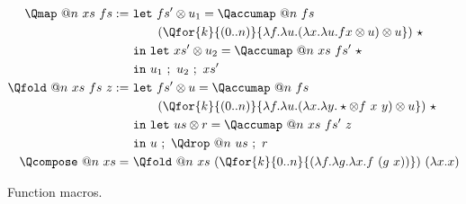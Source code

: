 \begin{table}[htbp]
  \begin{mdframed}
      \begin{align*}
      \Qmap\ @n\ xs\ fs :=\ 
        & \mathtt{let}\ {fs'\otimes u_1} = \Qaccumap\ @n\ fs\\
        & \qquad (\Qfor{k}{(0..n)}{\lambda f. \lambda u. (\lambda x.\lambda  u. f x \otimes u) \otimes u})\ \star\\
        & \mathtt{in\ let}\ {xs'\otimes u_2} = \Qaccumap\ @n\ xs\ fs'\ \star\\
        & \mathtt{in}\ {u_1\ ;\ u_2\ ;\ xs'}\\
      \Qfold\ @n\ xs\ fs\ z :=\ 
        & \mathtt{let}\ {fs'\otimes u} = \Qaccumap\ @n\ fs\\
        & \qquad (\Qfor{k}{(0..n)}{\lambda f. \lambda u. (\lambda x.\lambda  y. \star \otimes f\  x\  y) \otimes u})\ \star\\
        & \mathtt{in\ let}\ {us\otimes r} = \Qaccumap\ @n\ xs\ fs'\ z\\
        & \mathtt{in}\ {u\ ;\ \Qdrop\ @n\ us\ ;\ r}\\
      \Qcompose\ @n\ xs=\ 
        &\Qfold\ @n\ xs\ (\Qfor{k}{0..n}{(\lambda f.\lambda g.\lambda x. f\ (g\ x))})\ (\lambda x. x)\\
      \end{align*}
      \caption{Function macros.}
      \label{fig:function-macros}
      \end{mdframed}
  \end{table}
